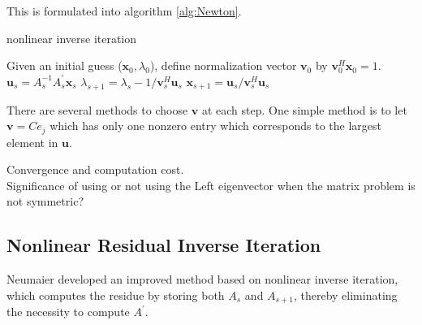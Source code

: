 \documentclass[11pt,letterpaper]{article}
\begin{document}
This is formulated into algorithm \ref{alg:Newton}. 
\begin{algorithm}
\caption{nonlinear inverse iteration}
\label{alg:Newton}
\begin{algorithmic}
\STATE Given an initial guess ($\mathbf{x}_0,\lambda_0$), define normalization vector $\mathbf{v}_0$ by $\mathbf{v}_{0}^{H}\mathbf{x}_0=1$.
\STATE $\mathbf{u}_{s} = A_{s}^{-1} A_{s}^{\prime} \mathbf{x}_s$
\STATE $\lambda_{s+1} = \lambda_{s} - 1/\mathbf{v}_{s}^H\mathbf{u}_{s} $
\STATE $\mathbf{x}_{s+1}= \mathbf{u}_{s}/ \mathbf{v}_{s}^{H}\mathbf{u}_{s}$
\ENDFOR
\end{algorithmic}
\end{algorithm}
There are several methods to choose $\mathbf{v}$ at each step. One simple method is to let $\mathbf{v}=C e_{j}$ which has only one nonzero entry which corresponds to the largest element in $\mathbf{u}$. 

Convergence and computation cost. \\
Significance of using or not using the Left eigenvector when the matrix problem is not symmetric? \\
\subsection{Nonlinear Residual Inverse Iteration}
Neumaier developed an improved method based on nonlinear inverse iteration, which computes the residue by storing both $A_{s}$ and $A_{s+1}$, thereby eliminating the necessity to compute $A^{\prime}$. \citep{neumaier1985residual} 
\end{document}
